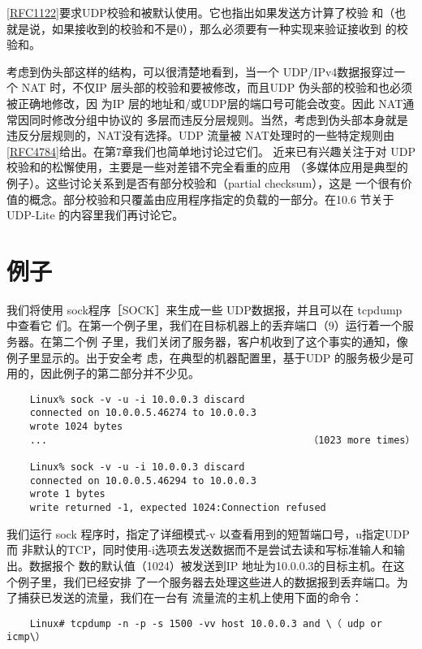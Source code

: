 \begin{tcolorbox}
    \href{https://www.rfc-editor.org/rfc/rfc1122}{[RFC1122]}要求UDP校验和被默认使用。它也指出如果发送方计算了校验
    和（也就是说，如果接收到的校验和不是0），那么必须要有一种实现来验证接收到
    的校验和。
\end{tcolorbox}

考虑到伪头部这样的结构，可以很清楚地看到，当一个 UDP/IPv4数据报穿过一个 NAT
时，不仅IP 层头部的校验和要被修改，而且UDP 伪头部的校验和也必须被正确地修改，因
为IP 层的地址和/或UDP层的端口号可能会改变。因此 NAT通常因同时修改分组中协议的
多层而违反分层规则。当然，考虑到伪头部本身就是违反分层规则的，NAT没有选择。UDP
流量被 NAT处理时的一些特定规则由\href{https://www.rfc-editor.org/rfc/rfc4784}{[RFC4784]}给出。在第7章我们也简单地讨论过它们。
近来已有兴趣关注于对 UDP校验和的松懈使用，主要是一些对差错不完全看重的应用
（多媒体应用是典型的例子）。这些讨论关系到是否有部分校验和（partial checksum），这是
一个很有价值的概念。部分校验和只覆盖由应用程序指定的负载的一部分。在10.6 节关于
UDP-Lite 的内容里我们再讨论它。

\section{例子}
我们将使用 sock程序［SOCK］来生成一些 UDP数据报，并且可以在 tcpdump 中查看它
们。在第一个例子里，我们在目标机器上的丢弃端口（9）运行着一个服务器。在第二个例
子里，我们关闭了服务器，客户机收到了这个事实的通知，像例子里显示的。出于安全考
虑，在典型的机器配置里，基于UDP 的服务极少是可用的，因此例子的第二部分并不少见。

\begin{verbatim}
    Linux% sock -v -u -i 10.0.0.3 discard
    connected on 10.0.0.5.46274 to 10.0.0.3
    wrote 1024 bytes
    ...                                             （1023 more times）

    Linux% sock -v -u -i 10.0.0.3 discard
    connected on 10.0.0.5.46294 to 10.0.0.3
    wrote 1 bytes
    write returned -1, expected 1024:Connection refused
\end{verbatim}

我们运行 sock 程序时，指定了详细模式-v 以查看用到的短暂端口号，u指定UDP而
非默认的TCP，同时使用-i选项去发送数据而不是尝试去读和写标准输人和输出。数据报个
数的默认值（1024）被发送到IP 地址为10.0.0.3的目标主机。在这个例子里，我们已经安排
了一个服务器去处理这些进人的数据报到丢弃端口。为了捕获已发送的流量，我们在一台有
流量流的主机上使用下面的命令：

\begin{verbatim}
    Linux# tcpdump -n -p -s 1500 -vv host 10.0.0.3 and \（ udp or icmp\）
\end{verbatim}

